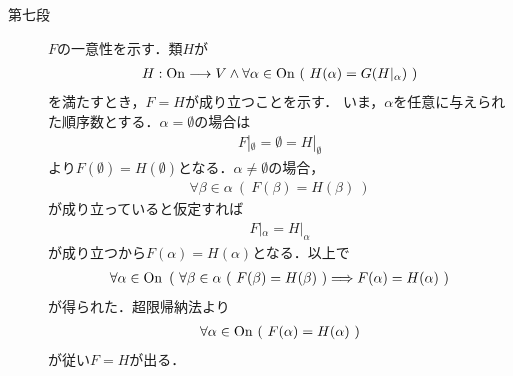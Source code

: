 \begin{prf}
\begin{description}
			\item[第七段]
				$F$の一意性を示す．類$H$が
				\begin{align}
					H:\mathrm{On} \longrightarrow V 
					\wedge \forall \alpha \in \mathrm{On}\ (\ H(\alpha) = G(H|_\alpha)\ )
				\end{align}
				を満たすとき，$F = H$が成り立つことを示す．
				いま，$\alpha$を任意に与えられた順序数とする．$\alpha = \emptyset$の場合は
				\begin{align}
					F|_\emptyset = \emptyset = H|_\emptyset
				\end{align}
				より$F(\emptyset) = H(\emptyset)$となる．$\alpha \neq \emptyset$の場合，
				\begin{align}
					\forall \beta \in \alpha\ (\ F(\beta) = H(\beta)\ )
				\end{align}
				が成り立っていると仮定すれば
				\begin{align}
					F|_\alpha = H|_\alpha
				\end{align}
				が成り立つから$F(\alpha) = H(\alpha)$となる．以上で
				\begin{align}
					\forall \alpha \in \ON\ \left(\ \forall \beta \in \alpha\ 
					(\ F(\beta) = H(\beta)\ ) \Longrightarrow F(\alpha) = H(\alpha)\ \right)
				\end{align}
				が得られた．超限帰納法より
				\begin{align}
					\forall \alpha \in \mathrm{On}\ (\ F(\alpha) = H(\alpha)\ )
				\end{align}
				が従い$F = H$が出る．
				\QED
		\end{description}
	\end{prf}
